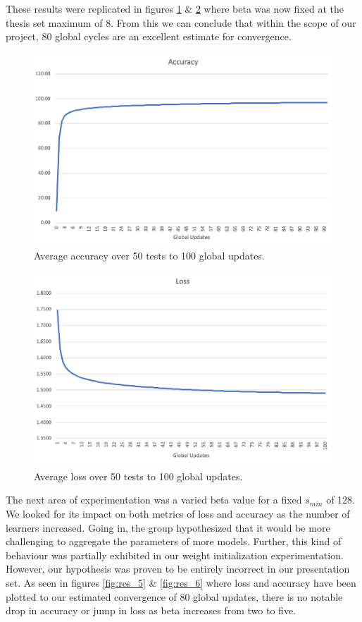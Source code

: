 \documentclass[../mthe-493-final-project.tex]{subfiles}
\begin{document}
    These results were replicated in figures \ref{fig:res_3} \& \ref{fig:res_4} where beta was now fixed at the thesis set maximum of 8. From this we can conclude that within the scope of our project, 80 global cycles are an excellent estimate for convergence.
    \begin{figure}
        \centering
        \includegraphics[width=140mm]{thesis/img/res_3.png}
        \caption{Average accuracy over 50 tests to 100 global updates.}
        \label{fig:res_3}
    \end{figure}
    \begin{figure}
        \centering
        \includegraphics[width=140mm]{thesis/img/res_4.png}
        \caption{Average loss over 50 tests to 100 global updates.}
        \label{fig:res_4}
    \end{figure}
    The next area of experimentation was a varied beta value for a fixed $s_{min}$ of 128. We looked for its impact on both metrics of loss and accuracy as the number of learners increased. Going in, the group hypothesized that it would be more challenging to aggregate the parameters of more models. Further, this kind of behaviour was partially exhibited in our weight initialization experimentation. However, our hypothesis was proven to be entirely incorrect in our presentation set. As seen in figures \ref{fig:res_5} \& \ref{fig:res_6} where loss and accuracy have been plotted to our estimated convergence of 80 global updates, there is no notable drop in accuracy or jump in loss as beta increases from two to five. 
\end{document}
